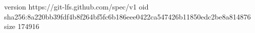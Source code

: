 version https://git-lfs.github.com/spec/v1
oid sha256:8a220bb39fdf4b8f264bf5fc6b186eee0422ca547426b11850edc2be8a814876
size 174916
